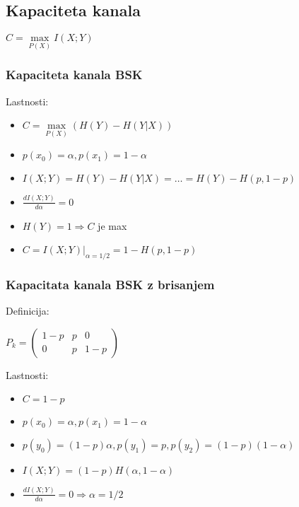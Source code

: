 \documentclass{article}
\begin{document}
\begin{multicols}{4}
\subsection{Kapaciteta kanala}
\begin{center}
    $C =\underset{P(X)}{\max} I(X;Y)$
\end{center}
\subsubsection{Kapaciteta kanala BSK}
Lastnosti:
\begin{itemize}
    \item $C =\underset{P(X)}{\max} (H(Y) - H(Y|X))$
    \item $p(x_0) = \alpha, p(x_1) = 1 - \alpha$
    \item $I(X;Y) = H(Y) - H(Y|X) = \dots = H(Y) - H(p, 1-p)$
    \item $\frac{dI(X;Y)}{d \alpha} = 0$
    \item $H(Y) = 1 \Rightarrow C$ je max
    \item $C=I(X;Y) |_{\alpha = 1/2} = 1 - H(p, 1-p)$
\end{itemize}
\subsubsection{Kapacitata kanala BSK z brisanjem}
Definicija:
\begin{center}
    \begin{math}
        P_k = 
                \begin{pmatrix}
                    1-p & p & 0\\
                    0   & p & 1-p
                \end{pmatrix}
    \end{math}
\end{center}
Lastnosti:
\begin{itemize}
    \item $C = 1 - p$
    \item $p(x_0) = \alpha, p(x_1) = 1 - \alpha$
    \item $p(y_0) = (1-p)\alpha, p(y_1) = p, p(y_2) = (1-p)(1-\alpha)$
    \item $I(X;Y) = (1-p)H(\alpha, 1 - \alpha)$
    \item $\frac{dI(X;Y)}{d \alpha} = 0 \Rightarrow \alpha = 1/2$
\end{itemize}


\end{multicols}
\end{document}
